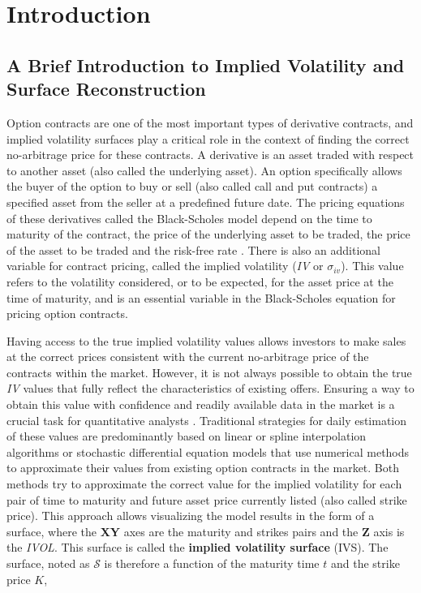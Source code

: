 \section{Introduction}
\subsection{A Brief Introduction to Implied Volatility and Surface Reconstruction}
Option contracts are one of the most important types of derivative contracts, and implied volatility surfaces play a critical role in the context of finding the correct no-arbitrage price \citep{Ludkovski2023} for these contracts. A derivative is an asset traded with respect to another asset (also called the underlying asset). An option specifically allows the buyer of the option to buy or sell (also called call and put contracts) a specified asset from the seller at a predefined future date. The pricing equations of these derivatives called the Black-Scholes model depend on the time to maturity of the contract, the price of the underlying asset to be traded, the price of the asset to be traded and the risk-free rate \citep{Black1973}. There is also an additional variable for contract pricing, called the implied volatility (\textit{IV} or $\sigma_{iv}$). This value refers to the volatility considered, or to be expected, for the asset price at the time of maturity, and is an essential variable in the Black-Scholes equation for pricing option contracts.

Having access to the true implied volatility values allows investors to make sales at the correct prices consistent with the current no-arbitrage price of the contracts within the market. However, it is not always possible to obtain the true \textit{IV} values that fully reflect the characteristics of existing offers. Ensuring a way to obtain this value with confidence and readily available data in the market is a crucial task for quantitative analysts \citep{Kim2006}. Traditional strategies for daily estimation of these values are predominantly based on linear or spline interpolation algorithms \citep{Homescu2011} or stochastic differential equation models \citep{Jordan2011} that use numerical methods to approximate their values from existing option contracts in the market. Both methods try to approximate the correct value for the implied volatility for each pair of time to maturity and future asset price currently listed (also called strike price). This approach allows visualizing the model results in the form of a surface, where the \textbf{XY} axes are the maturity and strikes pairs and the \textbf{Z} axis is the \textit{IVOL}. This surface is called the \textbf{implied volatility surface} (IVS). The surface, noted as $\mathcal{S}$ is therefore a function of the maturity time $t$ and the strike price $K$,

